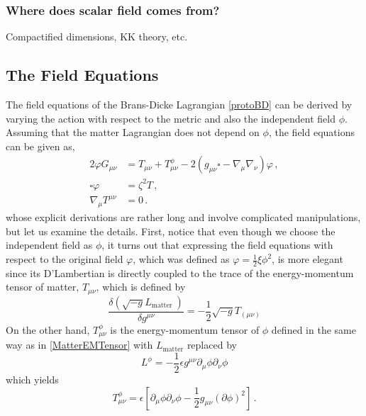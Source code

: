 \documentclass[12pt]{article}
\begin{document}
\subsubsection*{Where does scalar field comes from?}

Compactified dimensions, KK theory, etc.

\subsection{The Field Equations}

The field equations of the Brans-Dicke Lagrangian \eqref{protoBD} can be derived by varying the action with respect to the metric and also the independent field $\phi$.
Assuming that the matter Lagrangian does not depend on $\phi$, the field equations can be given as,
\begin{equation}\label{BDFieldEqs}
\begin{aligned}
    2 \varphi G_{\mu \nu} & =T_{\mu \nu}+T_{\mu \nu}^\phi-2\left(g_{\mu \nu} \square-\nabla_\mu \nabla_\nu\right) \varphi \,,\\
    \square \varphi & =\zeta^2 T \, ,\\
    \nabla_\mu T^{\mu \nu} & =0 \,.
\end{aligned}
\end{equation}
whose explicit derivations are rather long and involve complicated manipulations, but let us examine the details. 
First, notice that even though we choose the independent field as $\phi$, it turns out that expressing the field equations with respect to the original field $\varphi$, which was defined as $\varphi=\frac{1}{2} \xi \phi^2$, is more elegant since its D'Lambertian is directly coupled to the trace of the energy-momentum tensor of matter, $T_{\mu \nu}$, which is defined by
\begin{equation}\label{MatterEMTensor}
\frac{\delta\left(\sqrt{-g} L_{\text {matter }}\right)}{\delta g^{\mu \nu}}=-\frac{1}{2} \sqrt{-g} T_{(\mu \nu)} 
\end{equation}
On the other hand, $T_{\mu \nu}^{\phi}$ is the energy-momentum tensor of $\phi$ defined in the same way as in \eqref{MatterEMTensor} with $L_{\text {matter}}$ replaced by
\begin{equation}
L^{\phi}=-\frac{1}{2} \epsilon g^{\mu \nu} \partial_{\mu} \phi \partial_{\nu} \phi
\end{equation}
which yields
\begin{equation}
T_{\mu \nu}^{\phi}=\epsilon\left[\partial_{\mu} \phi \partial_{\nu} \phi-\frac{1}{2} g_{\mu \nu}(\partial \phi)^{2}\right] \,.
\end{equation}
\end{document}
